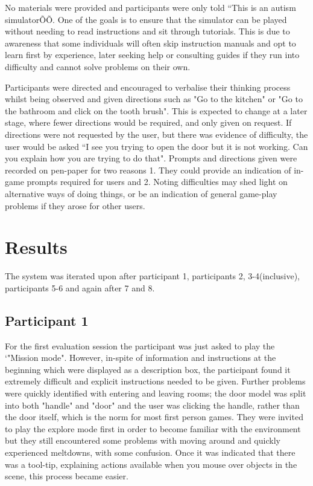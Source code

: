 \documentclass[11pt]{report}
\begin{document}
No materials were provided and participants were only told ``This is an autism simulatorÕÕ. One of the goals is to ensure that the simulator can be played without needing to read instructions and sit through tutorials. This is due to awareness that some individuals will often skip instruction manuals and opt to learn first by experience, later seeking help or consulting guides if they run into difficulty and cannot solve problems on their own.

Participants were directed and encouraged to verbalise their thinking process whilst being observed and given directions such as "Go to the kitchen" or "Go to the bathroom and click on the tooth brush". This is expected to change at a later stage, where fewer directions would be required, and only given on request. If directions were not requested by the user, but there was evidence of difficulty, the user would be asked ``I see you trying to open the door but it is not working. Can you explain how you are trying to do that". Prompts and directions given were recorded on pen-paper for two reasons 1. They could provide an indication of in-game prompts required for users and 2. Noting difficulties may shed light on alternative ways of doing things, or be an indication of general game-play problems if they arose for other users.

\section{Results}
The system was iterated upon after participant 1, participants 2, 3-4(inclusive), participants 5-6 and again after 7 and 8.

\subsection*{Participant 1}

For the first evaluation session the participant was just asked to play the `"Mission mode". However, in-spite of information and instructions at the beginning which were displayed as a description box, the participant found it extremely difficult and explicit instructions needed to be given. Further problems were quickly identified with entering and leaving rooms; the door model was split into both "handle" and "door" and the user was clicking the handle, rather than the door itself, which is the norm for most first person games. They were invited to play the explore mode first in order to become familiar with the environment but they still encountered some problems with moving around and quickly experienced meltdowns, with some confusion. Once it was indicated that there was a tool-tip, explaining actions available when you mouse over objects in the scene, this process became easier. 
\end{document}
